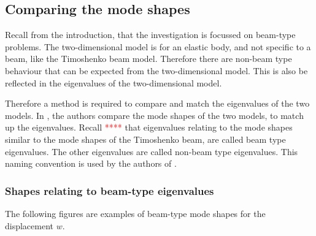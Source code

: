 \documentclass[../../main.tex]{subfiles}
\begin{document}
\subsection{Comparing the mode shapes}
Recall from the introduction, that the investigation is focussed on beam-type problems. The two-dimensional model is for an elastic body, and not specific to a beam, like the Timoshenko beam model. Therefore there are non-beam type behaviour that can be expected from the two-dimensional model. This is also be reflected in the eigenvalues of the two-dimensional model.

Therefore a method is required to compare and match the eigenvalues of the two models. In \cite{LVV09}, the authors compare the mode shapes of the two models, to match up the eigenvalues. Recall \textcolor{red}{****} that eigenvalues relating to the mode shapes similar to the mode shapes of the Timoshenko beam, are called beam type eigenvalues. The other eigenvalues are called non-beam type eigenvalues. This naming convention is used by the authors of \cite{LVV09}.

\subsubsection{Shapes relating to beam-type eigenvalues}
The following figures are examples of beam-type mode shapes for the displacement $w$.
\end{document}
